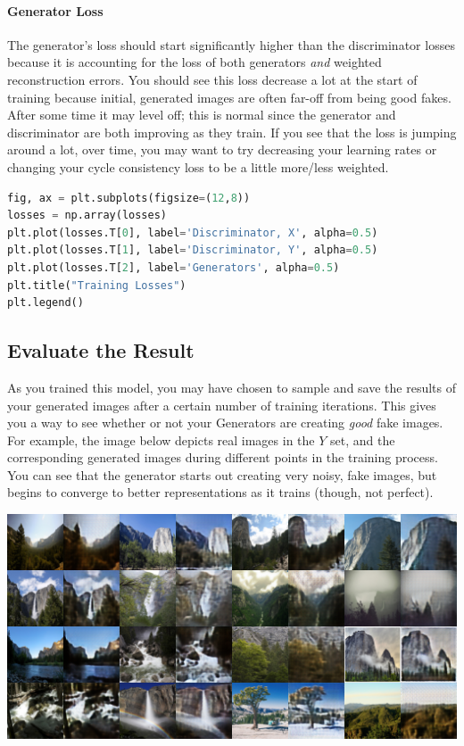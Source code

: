 \paragraph{Generator Loss}

The generator's loss should start significantly higher than the
discriminator losses because it is accounting for the loss of both
generators \emph{and} weighted reconstruction errors. You should see
this loss decrease a lot at the start of training because initial,
generated images are often far-off from being good fakes. After some
time it may level off; this is normal since the generator and
discriminator are both improving as they train. If you see that the loss
is jumping around a lot, over time, you may want to try decreasing your
learning rates or changing your cycle consistency loss to be a little
more/less weighted.

\begin{lstlisting}[language=Python]
fig, ax = plt.subplots(figsize=(12,8))
losses = np.array(losses)
plt.plot(losses.T[0], label='Discriminator, X', alpha=0.5)
plt.plot(losses.T[1], label='Discriminator, Y', alpha=0.5)
plt.plot(losses.T[2], label='Generators', alpha=0.5)
plt.title("Training Losses")
plt.legend()
\end{lstlisting}

\subsection{Evaluate the Result}

As you trained this model, you may have chosen to sample and save the
results of your generated images after a certain number of training
iterations. This gives you a way to see whether or not your Generators
are creating \emph{good} fake images. For example, the image below
depicts real images in the \(Y\) set, and the corresponding generated
images during different points in the training process. You can see that
the generator starts out creating very noisy, fake images, but begins to
converge to better representations as it trains (though, not perfect).

\includegraphics[width=0.5\linewidth]{img//genAdvNet//image2image/sample-004000-summer2winter.png}

